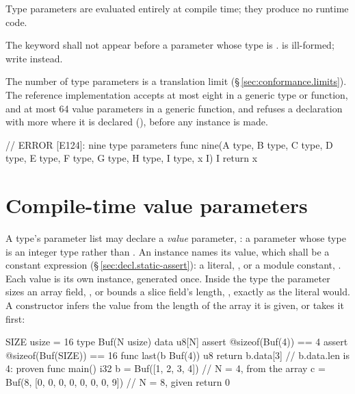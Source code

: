 \pnum
Type parameters are evaluated entirely at compile time; they produce
no runtime code.

\begin{constraint}
  The  keyword shall not appear before a parameter whose
  type is .   is ill-formed;
  write  instead.
\end{constraint}

\pnum
The number of type parameters is a translation limit (\S\,\ref{sec:conformance.limits}).  The
reference implementation accepts at most eight in a generic type or function, and at most 64 value
parameters in a generic function, and refuses a declaration with more where it is declared
(), before any instance is made.

\begin{laincode}
// ERROR [E124]: nine type parameters
func nine(A type, B type, C type, D type, E type, F type, G type, H type, I type, x I) I {
    return x
}
\end{laincode}

\section{Compile-time value parameters}
\label{sec:gen.comptime-params}

\pnum
A type's parameter list may declare a \emph{value} parameter, : a
parameter whose type is an integer type rather than . An instance names
its value, which shall be a constant expression (\S\,\ref{sec:decl.static-assert}): a
literal, , or a module constant, . Each value is its own
instance, generated once. Inside the type the parameter sizes an array field,
, or bounds a slice field's length, , exactly as
the literal would. A constructor infers the value from the length of the array it is
given, or takes it first:

\begin{laincode}
SIZE usize = 16
type Buf(N usize) {
    data u8[N]
}
assert @sizeof(Buf(4)) == 4
assert @sizeof(Buf(SIZE)) == 16
func last(b Buf(4)) u8 {
    return b.data[3]                         // b.data.len is 4: proven
}
func main() i32 {
    b = Buf([1, 2, 3, 4])                    // N = 4, from the array
    c = Buf(8, [0, 0, 0, 0, 0, 0, 0, 9])     // N = 8, given
    return 0
}
\end{laincode}

